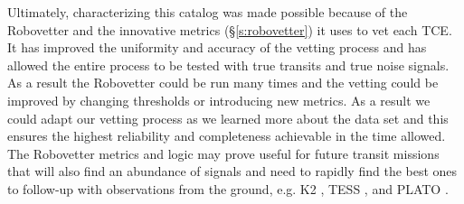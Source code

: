 Ultimately, characterizing this catalog was made possible because of the Robovetter and the innovative metrics (\S\ref{s:robovetter}) it uses to vet each TCE. It has improved the uniformity and accuracy of the vetting process and has allowed the entire process to be tested with true transits and true noise signals. As a result the Robovetter could be run many times and the vetting could be improved by changing thresholds or introducing new metrics. As a result we could adapt our vetting process as we learned more about the data set and this ensures the highest reliability and completeness achievable in the time allowed.  The Robovetter metrics and logic may prove useful for future transit missions that will also find an abundance of signals and need to rapidly find the best ones to follow-up with observations from the ground, e.g. K2 \citep{Howell2014}, TESS \citep{Ricker2015}, and PLATO \citep{Rauer2016}. 


